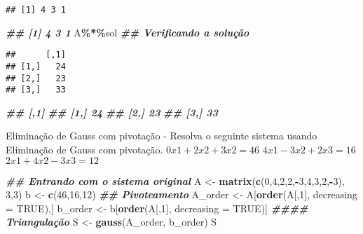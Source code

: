 \documentclass[
]{article}
\newenvironment{Shaded}{\begin{snugshade}}{\end{snugshade}}
\newcommand{\AttributeTok}[1]{\textcolor[rgb]{0.13,0.29,0.53}{#1}}
\newcommand{\ConstantTok}[1]{\textcolor[rgb]{0.56,0.35,0.01}{#1}}
\newcommand{\DecValTok}[1]{\textcolor[rgb]{0.00,0.00,0.81}{#1}}
\newcommand{\DocumentationTok}[1]{\textcolor[rgb]{0.56,0.35,0.01}{\textbf{\textit{#1}}}}
\newcommand{\FunctionTok}[1]{\textcolor[rgb]{0.13,0.29,0.53}{\textbf{#1}}}
\newcommand{\NormalTok}[1]{#1}
\newcommand{\OtherTok}[1]{\textcolor[rgb]{0.56,0.35,0.01}{#1}}
\newcommand{\SpecialCharTok}[1]{\textcolor[rgb]{0.81,0.36,0.00}{\textbf{#1}}}
\begin{document}
\begin{verbatim}
## [1] 4 3 1
\end{verbatim}

\begin{Shaded}
\begin{Highlighting}[]
\DocumentationTok{\#\# [1] 4 3 1}
\NormalTok{A}\SpecialCharTok{\%*\%}\NormalTok{sol }\DocumentationTok{\#\# Verificando a solução}
\end{Highlighting}
\end{Shaded}

\begin{verbatim}
##      [,1]
## [1,]   24
## [2,]   23
## [3,]   33
\end{verbatim}

\begin{Shaded}
\begin{Highlighting}[]
\DocumentationTok{\#\# [,1]}
\DocumentationTok{\#\# [1,] 24}
\DocumentationTok{\#\# [2,] 23}
\DocumentationTok{\#\# [3,] 33}
\end{Highlighting}
\end{Shaded}

Eliminação de Gauss com pivotação - Resolva o seguinte sistema usando
Eliminação de Gauss com pivotação. \(0x 1 + 2x 2 + 3x 2 = 46\)
\(4x 1 - 3x 2 + 2x 3 = 16\) \(2x 1 + 4x 2 - 3x 3 = 12\)

\begin{Shaded}
\begin{Highlighting}[]
\DocumentationTok{\#\# Entrando com o sistema original}
\NormalTok{A }\OtherTok{\textless{}{-}} \FunctionTok{matrix}\NormalTok{(}\FunctionTok{c}\NormalTok{(}\DecValTok{0}\NormalTok{,}\DecValTok{4}\NormalTok{,}\DecValTok{2}\NormalTok{,}\DecValTok{2}\NormalTok{,}\SpecialCharTok{{-}}\DecValTok{3}\NormalTok{,}\DecValTok{4}\NormalTok{,}\DecValTok{3}\NormalTok{,}\DecValTok{2}\NormalTok{,}\SpecialCharTok{{-}}\DecValTok{3}\NormalTok{), }\DecValTok{3}\NormalTok{,}\DecValTok{3}\NormalTok{)}
\NormalTok{b }\OtherTok{\textless{}{-}} \FunctionTok{c}\NormalTok{(}\DecValTok{46}\NormalTok{,}\DecValTok{16}\NormalTok{,}\DecValTok{12}\NormalTok{)}
\DocumentationTok{\#\# Pivoteamento}
\NormalTok{A\_order }\OtherTok{\textless{}{-}}\NormalTok{ A[}\FunctionTok{order}\NormalTok{(A[,}\DecValTok{1}\NormalTok{], }\AttributeTok{decreasing =} \ConstantTok{TRUE}\NormalTok{),]}
\NormalTok{b\_order }\OtherTok{\textless{}{-}}\NormalTok{ b[}\FunctionTok{order}\NormalTok{(A[,}\DecValTok{1}\NormalTok{], }\AttributeTok{decreasing =} \ConstantTok{TRUE}\NormalTok{)]}
\DocumentationTok{\#\#\#\# Triangulação}
\NormalTok{S }\OtherTok{\textless{}{-}} \FunctionTok{gauss}\NormalTok{(A\_order, b\_order)}
\NormalTok{S}
\end{Highlighting}
\end{Shaded}
\end{document}
